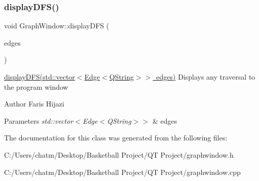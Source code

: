 \subsubsection{\texorpdfstring{displayDFS()}{displayDFS()}}
{\footnotesize\ttfamily void Graph\+Window\+::display\+D\+FS (\begin{DoxyParamCaption}\item[{std\+::vector$<$ \mbox{\hyperlink{struct_edge}{Edge}}$<$ Q\+String $>$$>$}]{edges }\end{DoxyParamCaption})}



\mbox{\hyperlink{class_graph_window_ac3ea3a3f53626f614cdab8035454f553}{display\+D\+F\+S(std\+::vector$<$\+Edge$<$\+Q\+String$>$$>$ edges)}} Displays any traversal to the program window 

\begin{DoxyAuthor}{Author}
Faris Hijazi 
\end{DoxyAuthor}

\begin{DoxyParams}{Parameters}
{\em std\+::vector$<$\+Edge$<$\+Q\+String$>$$>$} & edges \\
\hline
\end{DoxyParams}


The documentation for this class was generated from the following files\+:\begin{DoxyCompactItemize}
\item 
C\+:/\+Users/chatm/\+Desktop/\+Basketball Project/\+Q\+T Project/graphwindow.\+h\item 
C\+:/\+Users/chatm/\+Desktop/\+Basketball Project/\+Q\+T Project/graphwindow.\+cpp\end{DoxyCompactItemize}
